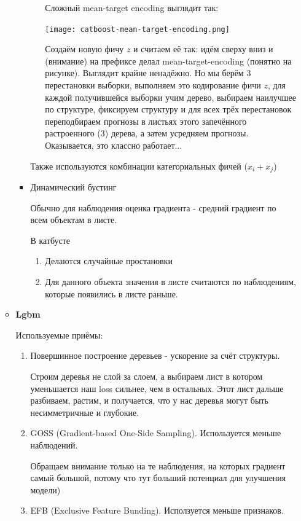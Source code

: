 \documentclass[12pt]{article}
\begin{document}
\begin{itemize}
\begin{itemize}
\begin{itemize}
\begin{enumerate}
Сложный mean-target encoding выглядит так:


\texttt{[image: catboost-mean-target-encoding.png]}

Создаём новую фичу $z$ и считаем её так: идём сверху вниз и (внимание) на префиксе делал mean-target-encoding (понятно на рисунке). Выглядит крайне ненадёжно. Но мы берём 3 перестановки выборки, выполняем это кодирование фичи $z$, для каждой получившейся выборки учим дерево, выбираем наилучшее по структуре, фиксируем структуру и для всех трёх перестановок переподбираем прогнозы в листьях этого запечённого растроенного (3) дерева, а затем усредняем прогнозы. Оказывается, это классно работает...
\end{enumerate}

Также используются комбинации категориальных фичей ($x_i + x_j$)

\item Динамический бустинг

Обычно для наблюдения оценка градиента - средний градиент по всем объектам в листе.

В катбусте \begin{enumerate}
\item Делаются случайные простановки
\item Для данного объекта значения в листе считаются по наблюдениям, которые появились в листе раньше.
\end{enumerate}

\end{itemize}

\item \textbf{Lgbm}

Используемые приёмы:
\begin{enumerate}
\item Повершинное построение деревьев - ускорение за счёт структуры.

Строим деревья не слой за слоем, а выбираем лист в котором уменьшается наш loss сильнее, чем в остальных. Этот лист дальше разбиваем, растим, и получается, что у нас деревья могут быть несимметричные и глубокие.

\item GOSS (Gradient-based One-Side Sampling). Используется меньше наблюдений.

Обращаем внимание только на те наблюдения, на которых градиент самый большой, потому что тут больший потенциал для улучшения модели)
\item EFB (Exclusive Feature Bunding). Исползуется меньше признаков.


\end{enumerate}
\end{itemize}
\end{itemize}
\end{document}

